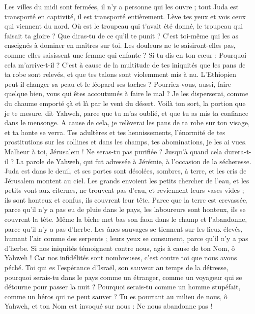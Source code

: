 \begin{multicols}{2}
Les villes du midi sont fermées, il n'y a personne qui les ouvre ; tout Juda est transporté en captivité, il est transporté entièrement.
Lève tes yeux et vois ceux qui viennent du nord. Où est le troupeau qui t'avait été donné, le troupeau qui faisait ta gloire ?
Que diras-tu de ce qu'il te punit ? C'est toi-même qui les as enseignés à dominer en maîtres sur toi. Les douleurs ne te saisiront-elles pas, comme elles saisissent une femme qui enfante ?
Si tu dis en ton cœur : Pourquoi cela m'arrive-t-il ? C'est à cause de la multitude de tes iniquités que les pans de ta robe sont relevés, et que tes talons sont violemment mis à nu.
L'Ethiopien peut-il changer sa peau et le léopard ses taches ? Pourriez-vous, aussi, faire quelque bien, vous qui êtes accoutumés à faire le mal ?
Je les disperserai, comme du chaume emporté çà et là par le vent du désert.
Voilà ton sort, la portion que je te mesure, dit Yahweh, parce que tu m'as oublié, et que tu as mis ta confiance dans le mensonge.
A cause de cela, je relèverai les pans de ta robe sur ton visage, et ta honte se verra.
Tes adultères et tes hennissements, l'énormité de tes prostitutions sur les collines et dans les champs, tes abominations, je les ai vues. Malheur à toi, Jérusalem ! Ne seras-tu pas purifiée ? Jusqu'à quand cela durera-t-il ?
\VerseOne{}La parole de Yahweh, qui fut adressée à Jérémie, à l'occasion de la sécheresse.
Juda est dans le deuil, et ses portes sont désolées, sombres, à terre, et les cris de Jérusalem montent au ciel.
Les grands envoient les petits chercher de l'eau, et les petits vont aux citernes, ne trouvent pas d'eau, et reviennent leurs vases vides ; ils sont honteux et confus, ils couvrent leur tête.
Parce que la terre est crevassée, parce qu'il n'y a pas eu de pluie dans le pays, les laboureurs sont honteux, ils se couvrent la tête.
Même la biche met bas son faon dans le champ et l'abandonne, parce qu'il n'y a pas d'herbe.
Les ânes sauvages se tiennent sur les lieux élevés, humant l'air comme des serpents ; leurs yeux se consument, parce qu'il n'y a pas d'herbe.
Si nos iniquités témoignent contre nous, agis à cause de ton Nom, ô Yahweh ! Car nos infidélités sont nombreuses, c'est contre toi que nous avons péché.
Toi qui es l'espérance d'Israël, son sauveur au temps de la détresse, pourquoi serais-tu dans le pays comme un étranger, comme un voyageur qui se détourne pour passer la nuit ?
Pourquoi serais-tu comme un homme stupéfait, comme un héros qui ne peut sauver ? Tu es pourtant au milieu de nous, ô Yahweh, et ton Nom est invoqué sur nous : Ne nous abandonne pas !

\end{multicols}
